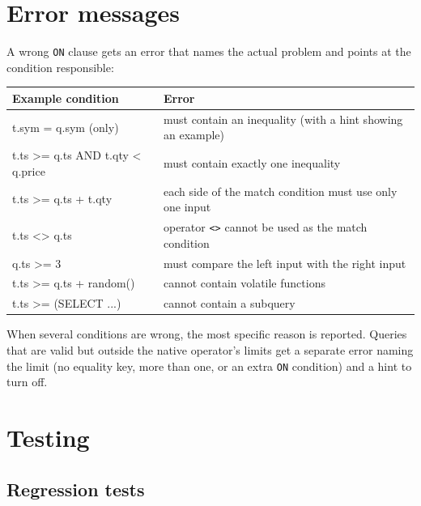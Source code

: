 \documentclass[11pt,a4paper]{article}
\newcommand{\code}[1]{\texttt{#1}}
\begin{document}
\section{Error messages}
\label{sec:errors}

A wrong \code{ON} clause gets an error that names the actual problem and points at the
condition responsible:

\begin{center}
\small
\begin{tabular}{@{}>{\ttfamily}p{5.2cm}p{9cm}@{}}
\toprule
\normalfont Example condition & Error \\
\midrule
t.sym = q.sym \textrm{(only)} & must contain an inequality (with a hint showing an example) \\
t.ts >= q.ts AND t.qty < q.price & must contain exactly one inequality \\
t.ts >= q.ts + t.qty & each side of the match condition must use only one input \\
t.ts <> q.ts & operator \code{<>} cannot be used as the match condition \\
q.ts >= 3 & must compare the left input with the right input \\
t.ts >= q.ts + random() & cannot contain volatile functions \\
t.ts >= (SELECT ...) & cannot contain a subquery \\
\bottomrule
\end{tabular}
\end{center}

When several conditions are wrong, the most specific reason is reported. Queries that are
valid but outside the native operator's limits get a separate error naming the limit (no
equality key, more than one, or an extra \code{ON} condition) and a hint to turn
 off.

\section{Testing}

\subsection{Regression tests}
\end{document}
